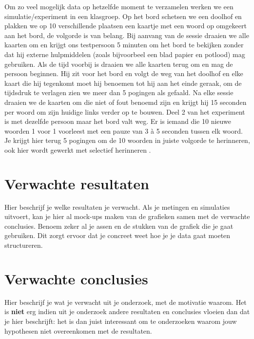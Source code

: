 \documentclass{voorstel}
\begin{document}
	Om zo veel mogelijk data op hetzelfde moment te verzamelen werken we een simulatie/experiment in een klasgroep. Op het bord schetsen we een doolhof en plakken we op 10 verschillende plaatsen een kaartje met een woord op omgekeert aan het bord, de volgorde is van belang. Bij aanvang van de sessie draaien we alle kaarten om en krijgt ons testpersoon 5 minuten om het bord te bekijken zonder dat hij externe hulpmiddelen (zoals bijvoorbeel een blad papier en potlood) mag gebruiken. Als de tijd voorbij is draaien we alle kaarten terug om en mag de persoon beginnen. Hij zit voor het bord en volgt de weg van het doolhof en elke kaart die hij tegenkomt moet hij benoemen tot hij aan het einde geraak, om de tijdsdruk te verlagen zien we meer dan 5 pogingen als gefaald. Na elke sessie draaien we de kaarten om die niet of fout benoemd zijn en krijgt hij 15 seconden per woord om zijn huidige links verder op te bouwen. Deel 2 van het experiment is met dezelfde persoon maar het bord valt weg. Er is iemand die 10 nieuwe woorden 1 voor 1 voorleest met een pauze van 3 à 5 seconden tussen elk woord. Je krijgt hier terug 5 pogingen om de 10 woorden in juiste volgorde te herinneren, ook hier wordt gewerkt met selectief herinneren \autocite{BuschkeFuld1974}.
	
	\section{Verwachte resultaten}
	\label{sec:verwachte_resultaten}
	
	Hier beschrijf je welke resultaten je verwacht. Als je metingen en simulaties uitvoert, kan je hier al mock-ups maken van de grafieken samen met de verwachte conclusies. Benoem zeker al je assen en de stukken van de grafiek die je gaat gebruiken. Dit zorgt ervoor dat je concreet weet hoe je je data gaat moeten structureren.
	
	\section{Verwachte conclusies}
	\label{sec:verwachte_conclusies}
	
	Hier beschrijf je wat je verwacht uit je onderzoek, met de motivatie waarom. Het is \textbf{niet} erg indien uit je onderzoek andere resultaten en conclusies vloeien dan dat je hier beschrijft: het is dan juist interessant om te onderzoeken waarom jouw hypothesen niet overeenkomen met de resultaten.
	
	
	
	\printbibliography[heading=bibintoc]
	
\end{document}
